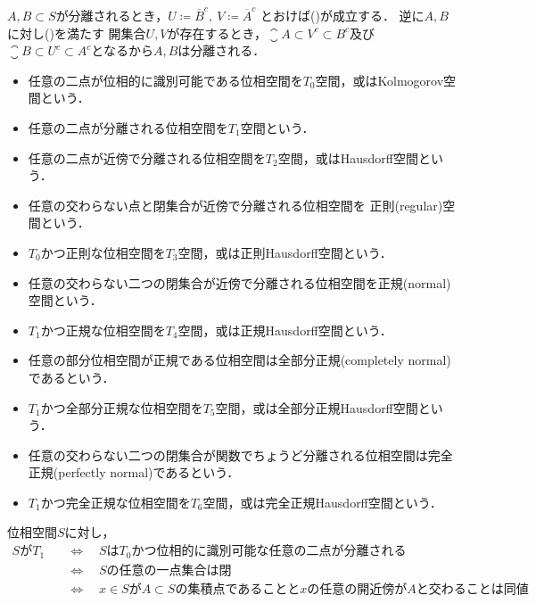 	\begin{prf}
		$A,B \subset S$が分離されるとき，$U \coloneqq \overline{B}^c,\ V \coloneqq \overline{A}^c$
		とおけば()が成立する．
		逆に$A,B$に対し()を満たす
		開集合$U,V$が存在するとき，$\closure{A} \subset V^c \subset B^c$及び
		$\closure{B} \subset U^c \subset A^c$となるから$A,B$は分離される．
		\QED
	\end{prf}
	
	\begin{screen}
		\begin{dfn}[分離公理]\mbox{}
			\begin{itemize}
				\item 任意の二点が位相的に識別可能である位相空間を$T_0$空間，或はKolmogorov空間という．
				\item 任意の二点が分離される位相空間を$T_1$空間という．
				\item 任意の二点が近傍で分離される位相空間を$T_2$空間，或はHausdorff空間という．
				\item 任意の交わらない点と閉集合が近傍で分離される位相空間を
					正則(regular)空間という．
				\item $T_0$かつ正則な位相空間を$T_3$空間，或は正則Hausdorff空間という．
				\item 任意の交わらない二つの閉集合が近傍で分離される位相空間を正規(normal)空間という．
				\item $T_1$かつ正規な位相空間を$T_4$空間，或は正規Hausdorff空間という．
				\item 任意の部分位相空間が正規である位相空間は全部分正規(completely normal)であるという．
				\item $T_1$かつ全部分正規な位相空間を$T_5$空間，或は全部分正規Hausdorff空間という．
				\item 任意の交わらない二つの閉集合が関数でちょうど分離される位相空間は完全正規(perfectly normal)であるという．
				\item $T_1$かつ完全正規な位相空間を$T_6$空間，或は完全正規Hausdorff空間という．
			\end{itemize}
		\end{dfn}
	\end{screen}
	
	\begin{screen}
		\begin{thm}[$T_1$空間とは一点集合が閉である空間]
			位相空間$S$に対し，
			\begin{align}
				\mbox{$S$が$T_1$}
				&\quad \Longleftrightarrow \quad \mbox{$S$は$T_0$かつ位相的に識別可能な任意の二点が分離される} \\
				&\quad \Longleftrightarrow \quad \mbox{$S$の任意の一点集合は閉} \\
				&\quad \Longleftrightarrow \quad \mbox{$x \in S$が$A \subset S$の集積点であることと$x$の任意の開近傍が$A$と交わることは同値}.
			\end{align}
		\end{thm}
	\end{screen}
	
